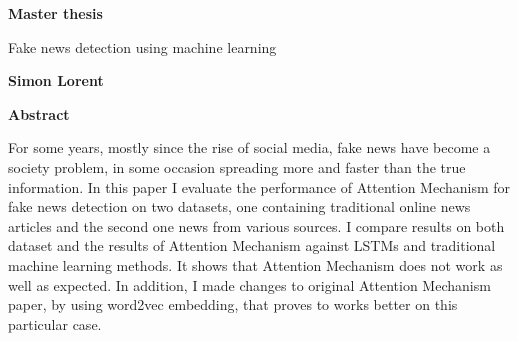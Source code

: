 ﻿\thispagestyle{plain}
\begin{center}
    \Large
    \textbf{Master thesis}
 
    \vspace{0.4cm}
    \large
    Fake news detection using machine learning
 
    \vspace{0.4cm}
    \textbf{Simon Lorent}
 
    \vspace{0.9cm}
    \textbf{Abstract}
\end{center}
For some years, mostly since the rise of social media, fake news have become a society problem, in some occasion spreading more and faster than the true information.
In this paper I evaluate the performance of Attention Mechanism for fake news detection on two datasets, one containing traditional online news articles and the second one news from various sources. I compare results on both dataset and the results of Attention Mechanism against LSTMs and traditional machine learning methods. It shows that Attention Mechanism does not work as well as expected. In addition, I made changes to original Attention Mechanism paper\cite{zhou-etal-2016-attention}, by using word2vec embedding, that proves to works better on this particular case. 